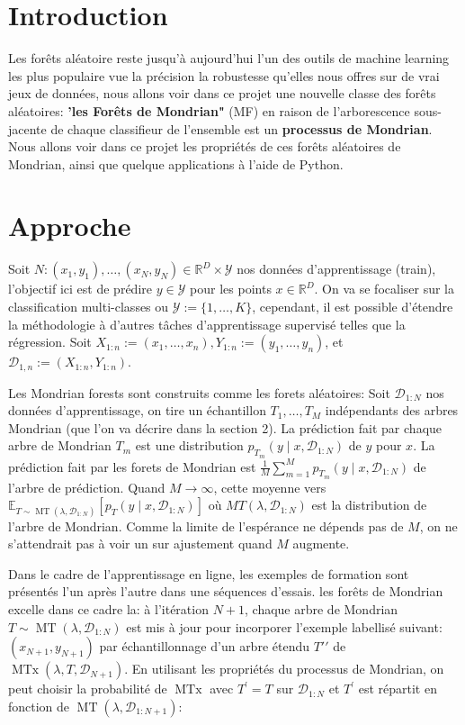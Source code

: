 \section{Introduction}
Les forêts aléatoire reste jusqu'à aujourd'hui l'un des outils de machine learning les plus populaire vue la précision la robustesse qu'elles nous offres sur de vrai jeux de données, nous allons voir dans ce projet une nouvelle classe des forêts aléatoires: \textbf{'les Forêts de Mondrian"} (MF)
en raison de l'arborescence sous-jacente de chaque classifieur de l'ensemble est un \textbf{processus de Mondrian}.
Nous allons voir dans ce projet les propriétés de ces forêts aléatoires de Mondrian, ainsi que quelque applications à l'aide de Python.


\section{Approche}

Soit $N: (x_1,y_1),\dots,(x_N,y_N)\in \mathbb{R}^D\times \mathcal{Y}$ nos données d'apprentissage (train), l'objectif ici est de prédire $y\in \mathcal{Y}$ pour les points $x\in\mathbb{R}^D$. On va se focaliser sur la classification multi-classes ou $\mathcal{Y}:=\{1, \ldots, K\}$, cependant, il est possible d'étendre la méthodologie à d'autres
tâches d'apprentissage supervisé telles que la régression. Soit $X_{1:n}:=(x_1,\dots,x_n),Y_{1:n}:=(y_1,\dots,y_n)$, et $\mathcal{D}_{1,n}:=(X_{1:n},Y_{1:n})$.

Les Mondrian forests sont construits comme les forets aléatoires:  Soit $\mathcal{D}_{1:N}$ nos données d'apprentissage, on tire un échantillon $T_1,\dots,T_M$ indépendants des arbres Mondrian (que l'on va décrire dans la section 2). La prédiction fait par chaque arbre de Mondrian $T_m$ est une distribution $p_{T_{m}}\left(y \mid x, \mathcal{D}_{1: N}\right)$ de $y$ pour $x$. La prédiction fait par les forets de Mondrian est $\frac{1}{M} \sum_{m=1}^{M} p_{T_{m}}\left(y \mid x, \mathcal{D}_{1: N}\right)$ de l'arbre de prédiction. Quand $M \rightarrow \infty$, cette moyenne vers $\mathbb{E}_{T \sim \operatorname{MT}\left(\lambda, \mathcal{D}_{1: N}\right)}\left[p_{T}\left(y \mid x, \mathcal{D}_{1: N}\right)\right]$ où $MT(\lambda,\mathcal{D}_{1:N})$ est la distribution de l'arbre de Mondrian.
Comme la limite de l'espérance ne dépends pas de $M$, on ne s'attendrait pas à voir un sur ajustement quand $M$ augmente.

Dans le cadre de l'apprentissage en ligne, les exemples de formation sont présentés l'un après l'autre dans une
séquences d'essais. les forêts de Mondrian excelle dans ce cadre la: à l'itération $N+1$, chaque arbre de Mondrian $T \sim \operatorname{MT}\left(\lambda, \mathcal{D}_{1: N}\right)$  est mis à jour pour incorporer l'exemple labellisé suivant: $(x_{N+1},y_{N+1})$  par échantillonnage d'un arbre étendu $T'\prime$ de $\operatorname{MTx}\left(\lambda, T, \mathcal{D}_{N+1}\right)$. En utilisant les propriétés du processus de Mondrian, on peut choisir la probabilité de $\operatorname{MTx}$ avec $T^\prime=T$ sur $\mathcal{D}_{1:N}$ et $T^\prime$ est répartit en fonction de $\operatorname{MT}\left(\lambda, \mathcal{D}_{1: N+1}\right)$:

